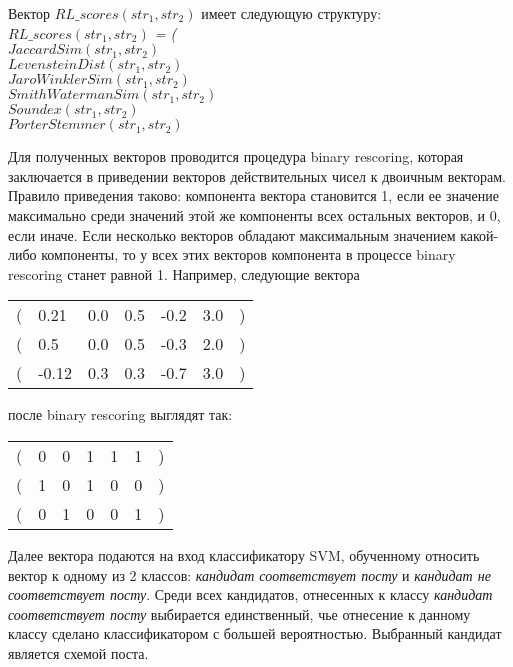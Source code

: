 Вектор $RL\_scores(str_1, str_2)$ имеет следующую структуру:\\

\noindent
\textit{$RL\_scores(str_1, str_2)$ = (\\
\-\hspace{1cm}	$JaccardSim(str_1, str_2)$\\
\-\hspace{1cm}	$LevensteinDist(str_1, str_2)$\\
\-\hspace{1cm}	$JaroWinklerSim(str_1, str_2)$\\
\-\hspace{1cm}	$SmithWatermanSim(str_1, str_2)$\\
\-\hspace{1cm}	$Soundex(str_1, str_2)$\\
\-\hspace{1cm}	$PorterStemmer(str_1, str_2)$\\
} %

Для полученных векторов проводится процедура binary rescoring, которая заключается в приведении векторов действительных чисел к двоичным векторам. Правило приведения таково: компонента вектора становится 1, если ее значение максимально среди значений этой же компоненты всех остальных векторов, и 0, если иначе. Если несколько векторов обладают максимальным значением какой-либо компоненты, то у всех этих векторов компонента в процессе binary rescoring станет равной 1. Например, следующие вектора

\begin{tabular}{l l l l l l l}
	( & 0.21 & 0.0 & 0.5 & -0.2 & 3.0 & )\\
	( & 0.5 & 0.0 & 0.5 & -0.3 & 2.0 & )\\
	( & -0.12 & 0.3 & 0.3 & -0.7 & 3.0 & )\\
\end{tabular}
\linebreak
после binary rescoring выглядят так:

\begin{tabular}{l l l l l l l}
	( & 0 & 0 & 1 & 1 & 1 & )\\
	( & 1 & 0 & 1 & 0 & 0 & )\\
	( & 0 & 1 & 0 & 0 & 1 & )\\
\end{tabular}
\linebreak
Далее вектора подаются на вход классификатору SVM, обученному относить вектор к одному из 2 классов: \textit{кандидат соответствует посту} и \textit{кандидат не соответствует посту}. Среди всех кандидатов, отнесенных к классу \textit{кандидат соответствует посту} выбирается единственный, чье отнесение к данному классу сделано классификатором с большей вероятностью. Выбранный кандидат является схемой поста.


